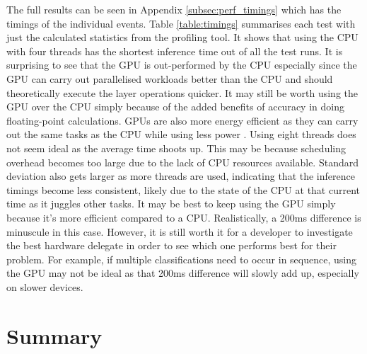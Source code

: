 \documentclass[12pt,a4paper]{report}
\begin{document}
The full results can be seen in Appendix \ref{subsec:perf_timings} which has the timings of the individual events. 
Table \ref{table:timings} 
summarises each test with just the calculated statistics from the profiling tool. It shows that using the CPU with four 
threads has the shortest inference time out of all the test runs. It is surprising to see that the GPU is out-performed 
by the CPU especially since the GPU can carry out parallelised workloads better than the CPU and should theoretically 
execute the layer operations quicker. It may still be worth using the GPU over the CPU simply because of the added 
benefits of accuracy in doing floating-point calculations. GPUs are also more energy efficient as they can carry out the
same tasks as the CPU while using less power \citep{TFGPU}. Using eight threads does not seem ideal as the average time shoots up. 
This may be because scheduling overhead becomes too large due to the lack of CPU resources available. 
Standard deviation also gets larger as more threads are used, indicating that the inference timings become less 
consistent, likely due to the state of the CPU at that current time as it juggles other tasks. It may be best to keep 
using the GPU simply because it's more efficient compared to a CPU. Realistically, a 200ms difference is minuscule in 
this case. However, it is still worth it for a developer to investigate the best hardware delegate in order to see 
which one performs best for their problem. For example, if multiple classifications need to occur in sequence, using 
the GPU may not be ideal as that 200ms difference will slowly add up, especially on slower devices. 

\section{Summary}
\end{document}
